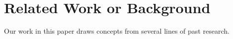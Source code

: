 \section{Related Work or Background} \label{sec:related}
Our work in this paper draws concepts from several lines of past research.


